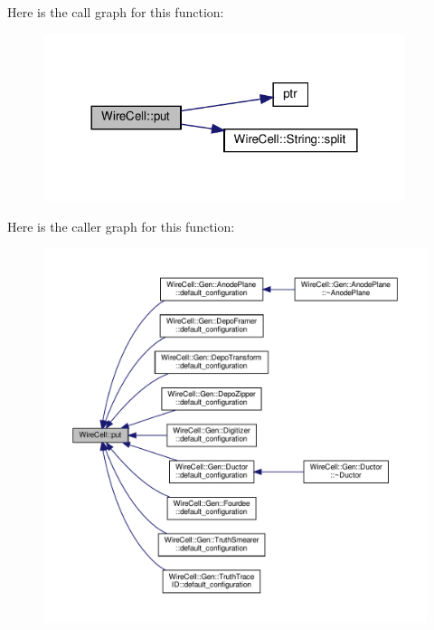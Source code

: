 Here is the call graph for this function\+:
\nopagebreak
\begin{figure}[H]
\begin{center}
\leavevmode
\includegraphics[width=300pt]{namespace_wire_cell_a86bf5b387104e6d8db8e9b8fa2d09e9c_cgraph}
\end{center}
\end{figure}
Here is the caller graph for this function\+:
\nopagebreak
\begin{figure}[H]
\begin{center}
\leavevmode
\includegraphics[width=350pt]{namespace_wire_cell_a86bf5b387104e6d8db8e9b8fa2d09e9c_icgraph}
\end{center}
\end{figure}
\mbox{\label{namespace_wire_cell_a5ff051f9db5117e68d6a372ce828a90a}} 
